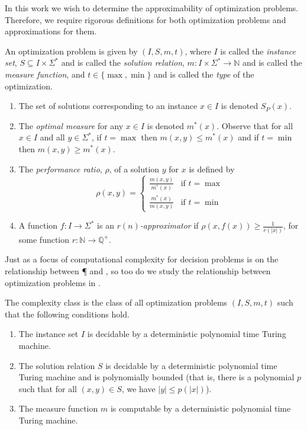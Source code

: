 \documentclass{article}
\begin{document}
In this work we wish to determine the approximability of optimization problems.
Therefore, we require rigorous definitions for both optimization problems and approximations for them.

\begin{definition}
  An optimization problem is given by $(I, S, m, t)$, where $I$ is called the \emph{instance set}, $S \subseteq I \times \Sigma^*$ and is called the \emph{solution relation}, $m \colon I \times \Sigma^* \to \mathbb{N}$ and is called the \emph{measure function}, and $t\in\{\max, \min\}$ and is called the \emph{type} of the optimization.
  \begin{enumerate}
  \item The set of solutions corresponding to an instance $x \in I$ is denoted $S_P(x)$.
  \item The \emph{optimal measure} for any $x \in I$ is denoted $m^*(x)$.
    Observe that for all $x \in I$ and all $y \in \Sigma^*$, if $t = \max$ then $m(x, y) \leq m^*(x)$ and if $t = \min$ then $m(x, y) \geq m^*(x)$.
  \item The \emph{performance ratio}, $\rho$, of a solution $y$ for $x$ is defined by
    \begin{equation*}
      \rho(x, y) =
      \begin{cases}
        \frac{m(x, y)}{m^*(x)} & \text{if } t = \max \\
        \frac{m^*(x)}{m(x, y)} & \text{if } t = \min
      \end{cases}
    \end{equation*}
  \item A function $f \colon I \to \Sigma^*$ is an \emph{$r(n)$-approximator} if $\rho(x, f(x)) \geq \frac{1}{r(|x|)}$, for some function $r \colon \mathbb{N} \to \mathbb{Q}^+$.
  \end{enumerate}
\end{definition}

Just as a focus of computational complexity for decision problems is on the relationship between \P{} and \NP{}, so too do we study the relationship between optimization problems in \NP{}.

\begin{definition}
  The complexity class \NPO{} is the class of all optimization problems $(I, S, m, t)$ such that the following conditions hold.
  \begin{enumerate}
  \item The instance set $I$ is decidable by a deterministic polynomial time Turing machine.
  \item The solution relation $S$ is decidable by a deterministic polynomial time Turing machine and is polynomially bounded (that is, there is a polynomial $p$ such that for all $(x, y) \in S$, we have $|y| \leq p(|x|)$).
  \item The measure function $m$ is computable by a deterministic polynomial time Turing machine.
  \end{enumerate}
\end{definition}
\end{document}
